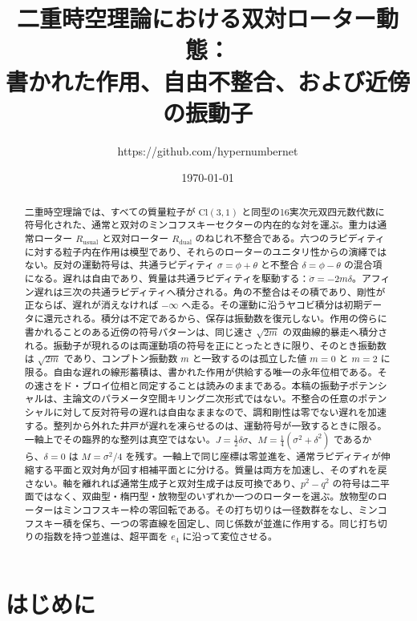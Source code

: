 \documentclass[a4paper]{article}
\title{二重時空理論における双対ローター動態：\\
書かれた作用、自由不整合、および近傍の振動子}
\author{https://github.com/hypernumbernet}
\date{\today}
\begin{document}
\maketitle

\begin{abstract}
二重時空理論では、すべての質量粒子が \(\mathrm{Cl}(3,1)\) と同型の16実次元双四元数代数に符号化された、通常と双対のミンコフスキーセクターの内在的な対を運ぶ。重力は通常ローター \(R_{\mathrm{usual}}\) と双対ローター \(R_{\mathrm{dual}}\) のねじれ不整合である。六つのラピディティに対する粒子内在作用は模型であり、それらのローターのユニタリ性からの演繹ではない。反対の運動符号は、共通ラピディティ \(\sigma=\phi+\theta\) と不整合 \(\delta=\phi-\theta\) の混合項になる。遅れは自由であり、質量は共通ラピディティを駆動する：\(\ddot\sigma=-2m\delta\)。アフィン遅れは三次の共通ラピディティへ積分される。角の不整合はその積であり、剛性が正ならば、遅れが消えなければ \(-\infty\) へ走る。その運動に沿うヤコビ積分は初期データに還元される。積分は不定であるから、保存は振動数を復元しない。作用の傍らに書かれることのある近傍の符号パターンは、同じ速さ \(\sqrt{2m}\) の双曲線的暴走へ積分される。振動子が現れるのは両運動項の符号を正にとったときに限り、そのとき振動数は \(\sqrt{2m}\) であり、コンプトン振動数 \(m\) と一致するのは孤立した値 \(m=0\) と \(m=2\) に限る。自由な遅れの線形蓄積は、書かれた作用が供給する唯一の永年位相である。その速さをド・ブロイ位相と同定することは読みのままである。本稿の振動子ポテンシャルは、主論文のパラメータ空間キリング二次形式ではない。不整合の任意のポテンシャルに対して反対符号の遅れは自由なままなので、調和剛性は零でない遅れを加速する。整列から外れた井戸が遅れを凍らせるのは、運動符号が一致するときに限る。一軸上でその臨界的な整列は真空ではない。\(J=\frac12\delta\sigma\)、\(M=\frac14(\sigma^2+\delta^2)\) であるから、\(\delta=0\) は \(M=\sigma^2/4\) を残す。一軸上で同じ座標は零並進を、通常ラピディティが伸縮する平面と双対角が回す相補平面とに分ける。質量は両方を加速し、そのずれを戻さない。軸を離れれば通常生成子と双対生成子は反可換であり、\(p^2-q^2\) の符号は二平面ではなく、双曲型・楕円型・放物型のいずれか一つのローターを選ぶ。放物型のローターはミンコフスキー枠の零回転である。その打ち切りは一径数群をなし、ミンコフスキー積を保ち、一つの零直線を固定し、同じ係数が並進に作用する。同じ打ち切りの指数を持つ並進は、超平面を \(e_4\) に沿って変位させる。
\end{abstract}

\section{はじめに}
\end{document}
